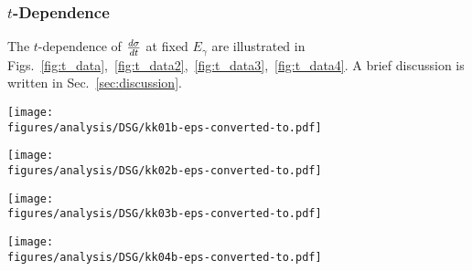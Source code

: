 \subsubsection{$t$-Dependence}
\label{tDep}
The $t$-dependence of $\frac{\lowercase{d}\sigma}{\lowercase{d}t}$ at fixed $E_{\gamma}$ are illustrated in Figs.~\ref{fig:t_data},~\ref{fig:t_data2},~\ref{fig:t_data3},~\ref{fig:t_data4}. A brief discussion is written in Sec.~\ref{sec:discussion}.
\begin{figure*}[htb!]
\texttt{[image: \\figures/analysis/DSG/kk01b-eps-converted-to.pdf]}
\caption[$\pi^0$ photoproduction cross section, $(d\sigma/dt)$, off the proton at $E_{\gamma}$ = 1275 -- 2225~MeV versus momentum transfer $t$]{\label{fig:t_data}(Color online) $\pi^0$ photoproduction cross section, $(d\sigma/dt)$, off the proton at $E_{\gamma}$ = 1275 -- 2225~MeV versus momentum transfer $t$. Notation as in Fig.~\protect\ref{fig:results.xsection1}.}
\end{figure*}

\begin{figure*}[htb!]
\texttt{[image: \\figures/analysis/DSG/kk02b-eps-converted-to.pdf]}
\caption[$\pi^0$ photoproduction cross section, $(d\sigma/dt)$, off the proton at $E_{\gamma}$ = 2275 -- 3375~MeV versus momentum transfer $t$]{\label{fig:t_data2}(Color online) $\pi^0$ photoproduction cross section, $(d\sigma/dt)$, off the proton at $E_{\gamma}$ = 2275 -- 3375~MeV versus momentum transfer $t$. Notation as in Fig.~\protect\ref{fig:results.xsection1}.}
\end{figure*}

\begin{figure*}[htb!]
\texttt{[image: \\figures/analysis/DSG/kk03b-eps-converted-to.pdf]}
\caption[$\pi^0$ photoproduction cross section, $(d\sigma/dt)$, off the proton at $E_{\gamma}$ = 3425 -- 4425~MeV versus momentum transfer $t$]{\label{fig:t_data3}(Color online) $\pi^0$ photoproduction cross section, $(d\sigma/dt)$, off the proton at $E_{\gamma}$ = 3425 -- 4425~MeV versus momentum transfer $t$. Notation as in Fig.~\protect\ref{fig:results.xsection1}.}
\end{figure*}

\begin{figure*}[htb!]
\texttt{[image: \\figures/analysis/DSG/kk04b-eps-converted-to.pdf]}
\caption[$\pi^0$ photoproduction cross section, $(d\sigma/dt)$, off the proton at  $E_{\gamma}$ = 4475 -- 5425~MeV versus momentum transfer $t$]{\label{fig:t_data4}(Color online) $\pi^0$ photoproduction cross section, $(d\sigma/dt)$, off the proton at  $E_{\gamma}$ = 4475 -- 5425~MeV versus momentum transfer $t$. Notation as in Fig.~\protect\ref{fig:results.xsection1}.}
\end{figure*}

